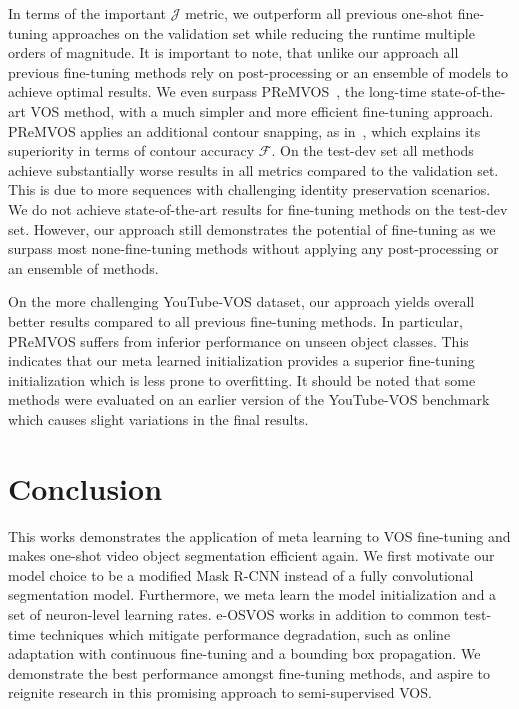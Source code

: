 \documentclass{article}
\begin{document}
In terms of the important $\mathcal{J}$ metric, we outperform all previous one-shot fine-tuning approaches on the validation set while reducing the runtime multiple orders of magnitude.
It is important to note, that unlike our approach all previous fine-tuning methods rely on post-processing or an ensemble of models to achieve optimal results.
We even surpass PReMVOS~\cite{luiten2018premvos}, the long-time state-of-the-art VOS method, with a much simpler and more efficient fine-tuning approach.
PReMVOS applies an additional contour snapping, as in~\cite{OSVOS}, which explains its superiority in terms of contour accuracy $\mathcal{F}$.
On the test-dev set all methods achieve substantially worse results in all metrics compared to the validation set.
This is due to more sequences with challenging identity preservation scenarios.
We do not achieve state-of-the-art results for fine-tuning methods on the test-dev set.
However, our approach still demonstrates the potential of fine-tuning as we surpass most none-fine-tuning methods without applying any post-processing or an ensemble of methods.

On the more challenging YouTube-VOS dataset, our approach yields overall better results compared to all previous fine-tuning methods.
In particular, PReMVOS suffers from inferior performance on unseen object classes.
This indicates that our meta learned initialization provides a superior fine-tuning initialization which is less prone to overfitting.
It should be noted that some methods were evaluated on an earlier version of the YouTube-VOS benchmark which causes slight variations in the final results. \section{Conclusion}

This works demonstrates the application of meta learning to VOS fine-tuning and makes one-shot video object segmentation efficient again.
We first motivate our model choice to be a modified Mask R-CNN instead of a fully convolutional segmentation model.
Furthermore, we meta learn the model initialization and a set of neuron-level learning rates.
e-OSVOS works in addition to common test-time techniques which mitigate performance degradation, such as online adaptation with continuous fine-tuning and a bounding box propagation.
We demonstrate the best performance amongst fine-tuning methods, and aspire to reignite research in this promising approach to semi-supervised VOS.
 \clearpage
\end{document}
